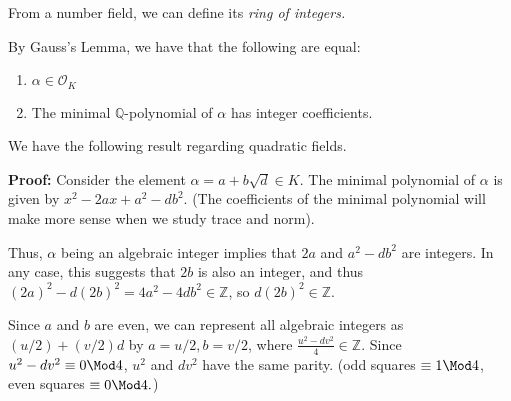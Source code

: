\documentclass[a4paper, 12pt,oneside,openany]{book}
\begin{document}
From a number field, we can define its \emph{ring of integers.}



By Gauss's Lemma, we have that the following are equal:
\begin{enumerate}
    \item $\alpha \in \mathcal{O}_K$
    \item The minimal $\mathbb{Q}$-polynomial of $\alpha$ has integer coefficients.
\end{enumerate}

We have the following result regarding quadratic fields.


\textbf{Proof:} Consider the element $\alpha=a+b\sqrt{d} \in K.$ The minimal polynomial of $\alpha$ is given by $x^2-2ax+a^2-db^2.$ (The coefficients of the minimal polynomial will make more sense when we study trace and norm).

Thus, $\alpha$ being an algebraic integer implies that $2a$ and $a^2-db^2$ are integers. In any case, this suggests that $2b$ is also an integer, and thus $(2a)^2-d(2b)^2=4a^2-4db^2 \in \mathbb{Z}$, so $d(2b)^2 \in \mathbb{Z}.$

Since $a$ and $b$ are even, we can represent all algebraic integers as $(u/2)+(v/2)d$ by $a=u/2, b=v/2$, where $\frac{u^2-dv^2}{4} \in \mathbb{Z}.$ Since $u^2-dv^2 \equiv 0 \Mod 4$, $u^2$ and $dv^2$ have the same parity. (odd squares $\equiv 1 \Mod 4$, even squares $\equiv 0 \Mod 4.$)
\end{document}
